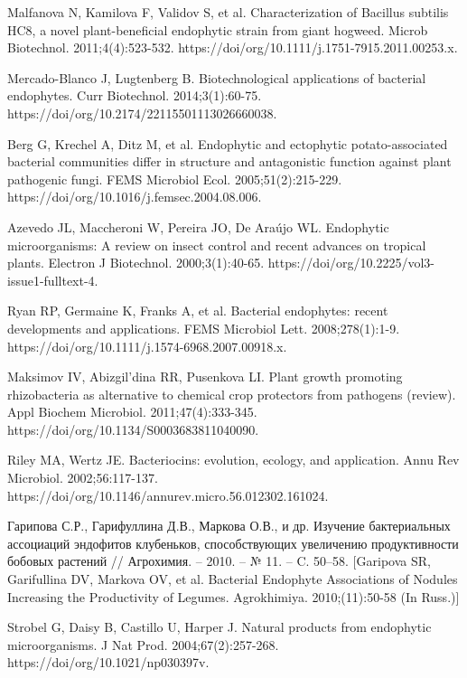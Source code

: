 \documentclass[11pt]{article}
\begin{document}
\begin{thebibliography}{3}
		 Malfanova N, Kamilova F, Validov S, et al. Characterization of Bacillus subtilis HC8, a novel plant-beneficial endophytic strain from giant hogweed. Microb Biotechnol. 2011;4(4):523-532. https://doi/org/10.1111/j.1751-7915.2011.00253.x.
		
		 Mercado-Blanco J, Lugtenberg B. Biotechnological applications of bacterial endophytes. Curr Biotechnol. 2014;3(1):60-75. https://doi/org/10.2174/22115501113026660038.
		
		 Berg G, Krechel A, Ditz M, et al. Endophytic and ectophytic potato-associated bacterial communities differ in structure and antagonistic function against plant pathogenic fungi. FEMS Microbiol Ecol. 2005;51(2):215-229. https://doi/org/10.1016/j.femsec.2004.08.006.
		
		 Azevedo JL, Maccheroni W, Pereira JO, De Araújo WL. Endophytic microorganisms: A review on insect control and recent advances on tropical plants. Electron J Biotechnol. 2000;3(1):40-65. https://doi/org/10.2225/vol3-issue1-fulltext-4.
		
		 Ryan RP, Germaine K, Franks A, et al. Bacterial endophytes: recent developments and applications. FEMS Microbiol Lett. 2008;278(1):1-9. https://doi/org/10.1111/j.1574-6968.2007.00918.x.
		
		 Maksimov IV, Abizgil’dina RR, Pusenkova LI. Plant growth promoting rhizobacteria as alternative to chemical crop protectors from pathogens (review). Appl Biochem Microbiol. 2011;47(4):333-345. https://doi/org/10.1134/S0003683811040090.
		
		 Riley MA, Wertz JE. Bacteriocins: evolution, ecology, and application. Annu Rev Microbiol. 2002;56:117-137. https://doi/org/10.1146/annurev.micro.56.012302.161024.
		
		 Гарипова С.Р., Гарифуллина Д.В., Маркова О.В., и др. Изучение бактериальных ассоциаций эндофитов клубеньков, способствующих увеличению продуктивности бобовых растений // Агрохимия. – 2010. – № 11. – C. 50–58. [Garipova SR, Garifullina DV, Markova OV, et al. Bacterial Endophyte Associations of Nodules Increasing the Productivity of Legumes. Agrokhimiya. 2010;(11):50-58 (In Russ.)]
		
		 Strobel G, Daisy B, Castillo U, Harper J. Natural products from endophytic microorganisms. J Nat Prod. 2004;67(2):257-268. https://doi/org/10.1021/np030397v.
		

\end{thebibliography}
\end{document}
